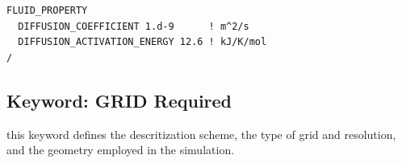 \documentclass[12pt]{article}
\begin{document}
\begin{mdframed}

\begin{verbatim}
FLUID_PROPERTY
  DIFFUSION_COEFFICIENT 1.d-9      ! m^2/s
  DIFFUSION_ACTIVATION_ENERGY 12.6 ! kJ/K/mol
/
\end{verbatim}
\end{mdframed}

\hyperlink{target_key}{\return}


\newpage
\protect\hypertarget{target_grid}{}

\subsection{Keyword: GRID \hfill Required}

 this keyword defines the descritization scheme, the type of grid and resolution, and the geometry employed in the simulation.
\end{document}
